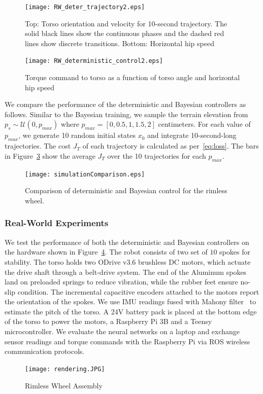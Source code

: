 \begin{figure}[H]
    \centering
    \texttt{[image: RW\_deter\_trajectory2.eps]}
    \caption{Top: Torso orientation and velocity for 10-second trajectory. The
            solid black lines show the continuous phases and the dashed red
            lines show discrete transitions. Bottom: Horizontal hip speed}
    \label{fig:deter_rw_trajectory}
\end{figure}

\begin{figure}[H]
    \centering
    \texttt{[image: RW\_deterministic\_control2.eps]}
    \caption{Torque command to torso as a function of torso angle and horizontal hip speed}
    \label{fig:deter_control}
\end{figure}
We compare the performance of the deterministic and Bayesian controllers as
follows.
%
Similar to the Bayesian training, we sample the terrain elevation from $p_s \sim
\mathcal{U}(0, p_{max})$ where $p_{max} = [0, 0.5, 1, 1.5, 2]$ centimeters.
%
For each value of $p_{max}$, we generate 10 random initial states $x_0$ and
integrate 10-second-long trajectories.
%
The cost $J_T$ of each trajectory is calculated as per~\eqref{eq:loss}.
%
The bars in Figure~\ref{fig:comparison} show the average $J_T$ over the
10 trajectories for each $p_{max}$.

\begin{figure}[H]
    \centering
    \texttt{[image: simulationComparison.eps]}
    \caption{Comparison of deterministic and Bayesian control for the rimless wheel.}
    \label{fig:comparison}
\end{figure}

\subsubsection{Real-World Experiments}

We test the performance of both the deterministic and Bayesian controllers on
the hardware shown in Figure~\ref{fig:hardware}.
%
The robot consists of two set of $10$ spokes for stability.
%
The torso holds two ODrive v3.6 brushless DC motors, which actuate the drive
shaft through a belt-drive system.
%
The end of the Aluminum spokes land on preloaded springs to reduce vibration,
while the rubber feet ensure no-slip condition.
%
The incremental capacitive encoders attached to the motors report the
orientation of the spokes.
%
We use IMU readings fused with Mahony filter~\cite{mahony2008nonlinear} to estimate
the pitch of the torso.
%
A 24V battery pack is placed at the bottom edge of the torso to power
the motors, a Raspberry Pi 3B and a Teensy microcontroller.
%
We evaluate the neural networks on a laptop and exchange sensor readings and
torque commands with the Raspberry Pi via ROS wireless communication protocols.


\begin{figure}[H]
    \centering
    \texttt{[image: rendering.JPG]}
    \caption{Rimless Wheel Assembly}
    \label{fig:hardware}
\end{figure}